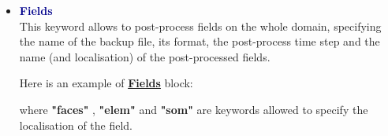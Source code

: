 \begin{itemize}







\item \textcolor{darkblue}{\textbf{Fields}}\\
This keyword allows to post-process fields on the whole domain, specifying the name of the backup file, its format, the post-process time step and the name (and localisation) of the post-processed fields.

Here is an example of \href{\REFERENCEMANUAL\#champsposts}{\textbf{Fields}} block:
    \begin{center}
    \end{center}

where \textbf{"faces"} , \textbf{"elem"} and \textbf{"som"} are keywords allowed to specify the localisation of the field.\\


\end{itemize}
